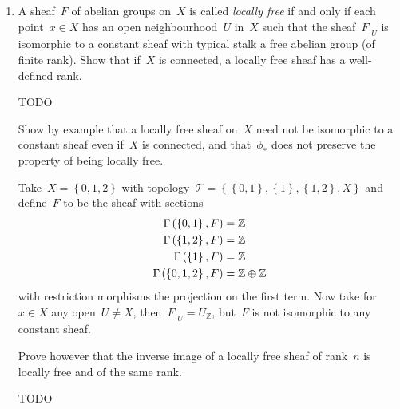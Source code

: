 \documentclass[a4paper,11pt,oneside,openany,article]{memoir}
\begin{document}
\begin{enumerate}
  \item A sheaf~$F$ of abelian groups on~$X$ is called \emph{locally free} if and only if each point~$x\in X$ has an open neighbourhood~$U$ in~$X$ such that the sheaf~$F|_U$ is isomorphic to a constant sheaf with typical stalk a free abelian group (of finite rank). Show that if~$X$ is connected, a locally free sheaf has a well-defined rank.

    \begin{solution}
      TODO
    \end{solution}

    Show by example that a locally free sheaf on~$X$ need not be isomorphic to a constant sheaf even if~$X$ is connected, and that~$\phi_*$ does not preserve the property of being locally free.

    \begin{solution}
      Take~$X=\left\{ 0,1,2 \right\}$ with topology~$\mathcal{T}=\left\{ \left\{ 0,1 \right\},\left\{ 1 \right\},\left\{ 1,2 \right\},X \right\}$ and define~$F$ to be the sheaf with sections
      \begin{align}
        \mathrm{\Gamma}\left( \left\{ 0,1 \right\},F \right)&=\mathbb{Z} \\
        \mathrm{\Gamma}\left( \left\{ 1,2 \right\},F \right)&=\mathbb{Z} \\
        \mathrm{\Gamma}\left( \left\{ 1 \right\},F \right)&=\mathbb{Z} \\
        \mathrm{\Gamma}\left( \left\{ 0,1,2 \right\},F \right)&=\mathbb{Z}\oplus\mathbb{Z}
      \end{align}
      with restriction morphisms the projection on the first term. Now take for~$x\in X$ any open~$U\neq X$, then~$F|_U=U_\mathbb{Z}$, but~$F$ is not isomorphic to any constant sheaf.
      

    \end{solution}

    Prove however that the inverse image of a locally free sheaf of rank~$n$ is locally free and of the same rank.

    \begin{solution}
      TODO
    \end{solution}
\end{enumerate}
\end{document}
